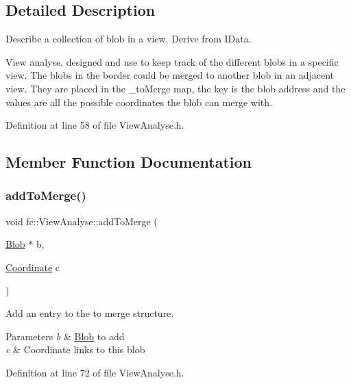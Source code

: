 \subsection{Detailed Description}
Describe a collection of blob in a view. Derive from I\+Data. 

View analyse, designed and use to keep track of the different blobs in a specific view. The blobs in the border could be merged to another blob in an adjacent view. They are placed in the \+\_\+to\+Merge map, the key is the blob address and the values are all the possible coordinates the blob can merge with. 

Definition at line 58 of file View\+Analyse.\+h.



\subsection{Member Function Documentation}
\mbox{\label{classfc_1_1ViewAnalyse_ab1138c97855a370559dd6df6521529c7}} 
\subsubsection{\texorpdfstring{add\+To\+Merge()}{addToMerge()}}
{\footnotesize\ttfamily void fc\+::\+View\+Analyse\+::add\+To\+Merge (\begin{DoxyParamCaption}\item[{\hyperlink{classfc_1_1Blob}{Blob} $\ast$}]{b,  }\item[{\hyperlink{namespacefc_a7da125cb1e99553c27c07139ee8a62ca}{Coordinate}}]{c }\end{DoxyParamCaption})\hspace{0.3cm}{\ttfamily [inline]}}



Add an entry to the to merge structure. 


\begin{DoxyParams}{Parameters}
{\em b} & \hyperlink{classfc_1_1Blob}{Blob} to add \\
\hline
{\em c} & Coordinate links to this blob \\
\hline
\end{DoxyParams}


Definition at line 72 of file View\+Analyse.\+h.

